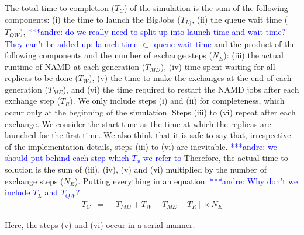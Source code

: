\documentclass{rspublic}
\newcommand{\alnote}[1]{ {\textcolor{blue} { ***andre: #1 }}}
\newcommand{\alnote}[1]{}
\begin{document}
The total time to completion ($T_{C}$) of the simulation is the sum of the following components:
 (i) the time to launch the BigJobs ($T_{L)}$, (ii) the queue wait time
($T_{QW}$), \alnote{do we really need to split up into launch time and wait time? They can't be added up: launch time $\subset$ queue wait time} and the product of the following components and the number of exchange steps ($N_{E}$): (iii) the actual runtime of NAMD at each generation ($T_{MD}$), (iv) time spent waiting 
for all replicas to be done ($T_{W}$), (v) the time to make the exchanges at the end of each 
generation ($T_{ME}$), and (vi) the time required to restart the NAMD jobs after each exchange 
step ($T_{R}$). We only include steps (i) 
and (ii) for completeness, which occur only at the beginning of the simulation. Steps (iii) to (vi) repeat after each exchange. We consider the start time as the time 
at which the replicas are launched for the first time. We also think that it is 
safe to say that, irrespective of the implementation details, steps (iii) to 
(vi) are inevitable. \alnote{we should put  behind each step which $T_{x}$ we refer to} 
Therefore, the actual time to solution is the sum of (iii), (iv), (v) and (vi) multiplied by the number of exchange steps ($N_{E}$). Putting everything in an equation:
\alnote{Why don't we include $T_{L}$ and $T_{QW}$?}
\begin{eqnarray}
T_{C} &=& [T_{MD} + T_{W} + T_{ME} + T_{R}] \times N_{E}
\label{eq:equation 1}
\end{eqnarray}

Here, the steps (v) and (vi) occur in a serial manner.
 
\end{document}
